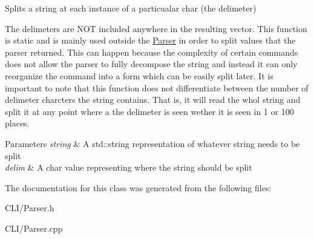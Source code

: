 Splits a string at each instance of a particualar char (the delimeter) 

The delimeters are N\+OT included anywhere in the resulting vector. This function is static and is mainly used outside the \mbox{\hyperlink{classParser}{Parser}} in order to split values that the parser returned. This can happen because the complexity of certain commands does not allow the parser to fully decompose the string and instead it can only reorganize the command into a form which can be easily split later. It is important to note that this function does not differentiate between the number of delimeter charcters the string contains. That is, it will read the whol string and split it at any point where a the delimeter is seen wether it is seen in 1 or 100 places.


\begin{DoxyParams}{Parameters}
{\em string} & A std\+::string representation of whatever string needs to be split \\
\hline
{\em delim} & A char value representing where the string should be split \\
\hline
\end{DoxyParams}


The documentation for this class was generated from the following files\+:\begin{DoxyCompactItemize}
\item 
C\+L\+I/Parser.\+h\item 
C\+L\+I/Parser.\+cpp\end{DoxyCompactItemize}
